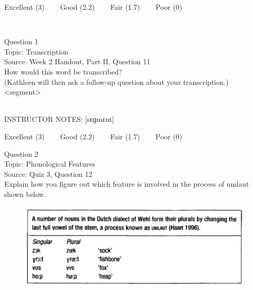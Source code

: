 \documentclass[12pt]{article}
\begin{document}
\vfill
Excellent (3) ~~~ Good (2.2) ~~~ Fair (1.7) ~~~ Poor (0)
\newpage

\begin{center}
\textbf{{\color{red}{\HUGE END OF EXAM}}}\\

\end{center}
\newpage

\begin{center}
\textbf{{\color{blue}{\HUGE START OF EXAM\\}}}

\textbf{{\color{blue}{\HUGE Student ID: 30794\\}}}

\textbf{{\color{blue}{\HUGE 4:40\\}}}

\end{center}
\newpage

{\large Question 1}\\

Topic: Transcription\\
Source: Week 2 Handout, Part II, Question 11\\

How would this word be transcribed?\\ (Kathleen will then ask a follow-up question about your transcription.)\\

<segment>


~\\
INSTRUCTOR NOTES: [sɛɡmɛnt]


\vfill
Excellent (3) ~~~ Good (2.2) ~~~ Fair (1.7) ~~~ Poor (0)
\newpage

{\large Question 2}\\

Topic: Phonological Features\\
Source: Quiz 3, Question 12\\

Explain how you figure out which feature is involved in the process of umlaut shown below.\\

\begin{figure}[H]
\includegraphics{../images/dutch.png}
\end{figure}
\end{document}
